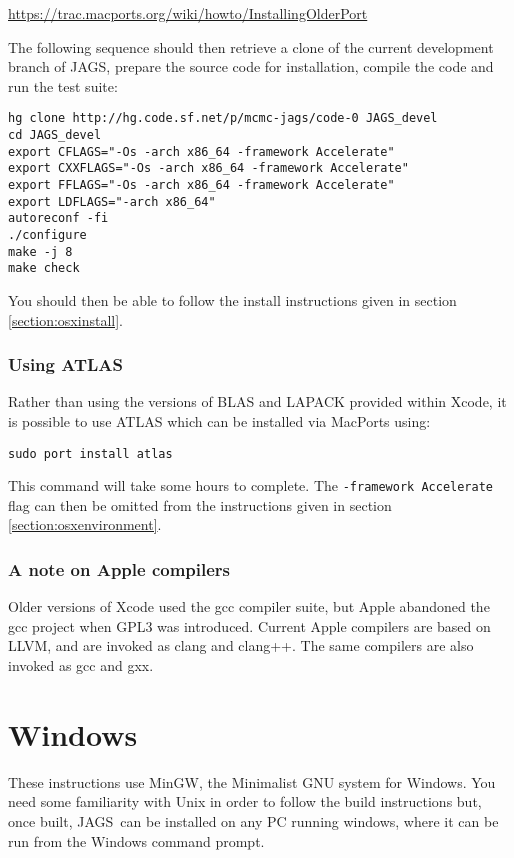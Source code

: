 \documentclass[11pt, a4paper, titlepage]{article}
\newcommand{\JAGS}{\textsf{JAGS}}
\begin{document}
 \url{https://trac.macports.org/wiki/howto/InstallingOlderPort}

The following sequence should then retrieve a clone of the current
development branch of \JAGS, prepare the source code for
installation, compile the code and run the test suite:

\begin{verbatim} 
hg clone http://hg.code.sf.net/p/mcmc-jags/code-0 JAGS_devel
cd JAGS_devel
export CFLAGS="-Os -arch x86_64 -framework Accelerate"
export CXXFLAGS="-Os -arch x86_64 -framework Accelerate"
export FFLAGS="-Os -arch x86_64 -framework Accelerate"
export LDFLAGS="-arch x86_64"
autoreconf -fi
./configure
make -j 8
make check
\end{verbatim}

You should then be able to follow the install instructions given in section \ref{section:osxinstall}.

\subsubsection{Using ATLAS}

Rather than using the versions of BLAS and LAPACK provided within Xcode, it
is possible to use ATLAS which can be installed via MacPorts using:

\begin{verbatim}
sudo port install atlas
\end{verbatim}

This command will take some hours to complete.  The \texttt{-framework Accelerate} flag can
then be omitted from the instructions given in section \ref{section:osxenvironment}.


\subsubsection{A note on Apple compilers}

Older versions of Xcode used the gcc compiler suite, but Apple abandoned
the gcc project when GPL3 was introduced.  Current Apple compilers are
based on LLVM, and are invoked as clang and clang++.  The same compilers
are also invoked as gcc and gxx.


\clearpage
\section{Windows}
\label{section:windows}

These instructions use MinGW, the Minimalist GNU system for Windows.
You need some familiarity with Unix in order to follow the build
instructions but, once built, \JAGS\ can be installed on any PC
running windows, where it can be run from the Windows command prompt.
\end{document}
